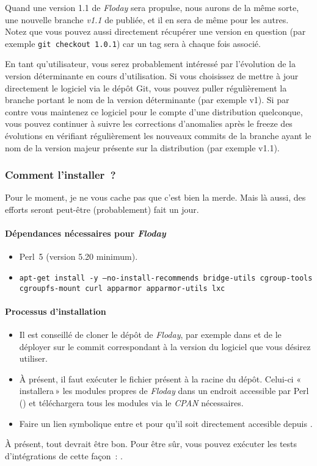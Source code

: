Quand une version 1.1 de \emph{Floday} sera \gls{propulse}, nous aurons de la même sorte, une nouvelle branche \emph{v1.1} de publiée, et il en sera de même pour les autres.
Notez que vous pouvez aussi directement récupérer une version en question (par exemple {\tt git checkout 1.0.1}) car un tag sera à chaque fois associé.

En tant qu'utilisateur, vous serez probablement intéressé par l'évolution de la version déterminante en cours d'utilisation. Si vous choisissez de mettre à jour directement le logiciel via le dépôt Git, vous pouvez puller régulièrement la branche portant le nom de la version déterminante (par exemple v1).
Si par contre vous maintenez ce logiciel pour le compte d'une distribution quelconque, vous pouvez continuer à suivre les corrections d'anomalies après le freeze des évolutions en vérifiant régulièrement les nouveaux commits de la branche ayant le nom de la version majeur présente sur la distribution (par exemple v1.1).

\subsubsection{Comment l'installer~?}

Pour le moment, je ne vous cache pas que c'est bien la merde.
Mais là aussi, des efforts seront peut-être (probablement) fait un jour.

\paragraph{Dépendances nécessaires pour \emph{Floday}}
\begin{itemize}
	\item Perl~5 (version 5.20 minimum).
	\item \texttt{apt-get install -y --no-install-recommends bridge-utils cgroup-tools\\cgroupfs-mount curl apparmor apparmor-utils lxc}
\end{itemize}

\paragraph{Processus d'installation}

\begin{itemize}
	\item Il est conseillé de cloner le dépôt de \emph{Floday}, par exemple dans  et de le déployer sur le commit correspondant à la version du logiciel que vous désirez utiliser.
	\item À présent, il faut exécuter le fichier  présent à la racine du dépôt.
		Celui-ci «\,installera\,» les modules propres de \emph{Floday} dans un endroit accessible par Perl () et téléchargera tous les modules via le \emph{CPAN} nécessaires.
	\item Faire un lien symbolique entre  et  pour qu'il soit directement accesible depuis .
\end{itemize}

À présent, tout devrait être bon. Pour être sûr, vous pouvez exécuter les tests d'intégrations de cette façon~:
.
